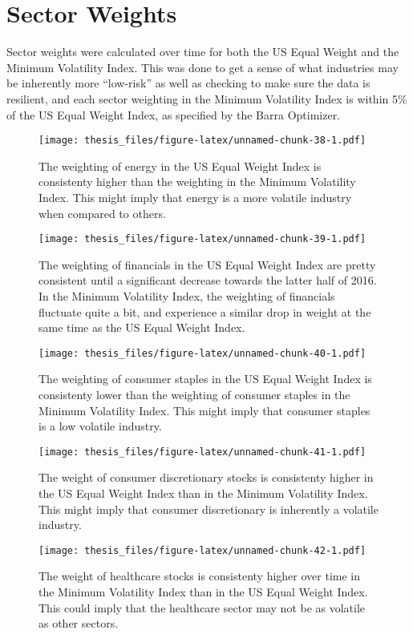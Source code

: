 \documentclass[12pt,twoside]{reedthesis}
\theoremstyle{definition}
\theoremstyle{definition}
\theoremstyle{definition}
\theoremstyle{remark}
\begin{document}
\section{Sector Weights}\label{sector-weights}

Sector weights were calculated over time for both the US Equal Weight
and the Minimum Volatility Index. This was done to get a sense of what
industries may be inherently more ``low-risk'' as well as checking to
make sure the data is resilient, and each sector weighting in the
Minimum Volatility Index is within 5\% of the US Equal Weight Index, as
specified by the Barra Optimizer.
\begin{figure}[htbp]
\centering
\texttt{[image: thesis\_files/figure-latex/unnamed-chunk-38-1.pdf]}
\caption{\label{fig:unnamed-chunk-38}The weighting of energy in the US Equal
Weight Index is consistenty higher than the weighting in the Minimum
Volatility Index. This might imply that energy is a more volatile
industry when compared to others.}
\end{figure}
\begin{figure}[htbp]
\centering
\texttt{[image: thesis\_files/figure-latex/unnamed-chunk-39-1.pdf]}
\caption{\label{fig:unnamed-chunk-39}The weighting of financials in the US
Equal Weight Index are pretty consistent until a significant decrease
towards the latter half of 2016. In the Minimum Volatility Index, the
weighting of financials fluctuate quite a bit, and experience a similar
drop in weight at the same time as the US Equal Weight Index.}
\end{figure}
\begin{figure}[htbp]
\centering
\texttt{[image: thesis\_files/figure-latex/unnamed-chunk-40-1.pdf]}
\caption{\label{fig:unnamed-chunk-40}The weighting of consumer staples in
the US Equal Weight Index is consistenty lower than the weighting of
consumer staples in the Minimum Volatility Index. This might imply that
consumer staples is a low volatile industry.}
\end{figure}
\begin{figure}[htbp]
\centering
\texttt{[image: thesis\_files/figure-latex/unnamed-chunk-41-1.pdf]}
\caption{\label{fig:unnamed-chunk-41}The weight of consumer discretionary
stocks is consistenty higher in the US Equal Weight Index than in the
Minimum Volatility Index. This might imply that consumer discretionary
is inherently a volatile industry.}
\end{figure}
\begin{figure}[htbp]
\centering
\texttt{[image: thesis\_files/figure-latex/unnamed-chunk-42-1.pdf]}
\caption{\label{fig:unnamed-chunk-42}The weight of healthcare stocks is
consistenty higher over time in the Minimum Volatility Index than in the
US Equal Weight Index. This could imply that the healthcare sector may
not be as volatile as other sectors.}
\end{figure}
\end{document}

